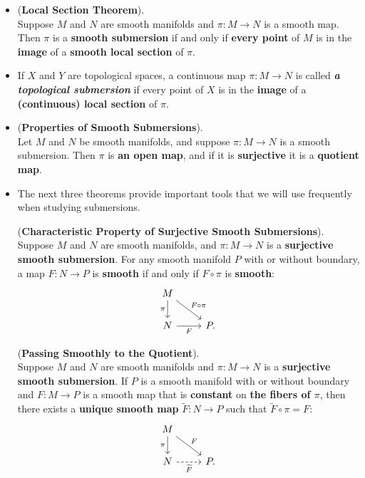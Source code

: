 \documentclass[11pt]{article}
\begin{document}
\begin{itemize}
\item \begin{theorem} (\textbf{Local Section Theorem}). \citep{lee2003introduction}\\
Suppose $M$ and $N$ are smooth manifolds and $\pi: M \rightarrow N$ is a smooth map. Then $\pi$ is a \textbf{smooth submersion} if and only if \textbf{every point} of $M$ is in the \textbf{image} of a \textbf{smooth local section} of $\pi$.
\end{theorem}

\item \begin{definition}
If $X$ and $Y$ are topological spaces, a continuous map $\pi: M \rightarrow N$ is called \emph{\textbf{a topological submersion}} if every point of $X$ is in the \textbf{image} of a \textbf{(continuous) local section} of $\pi$. 
\end{definition}

\item \begin{proposition} (\textbf{Properties of Smooth Submersions}). \\
Let $M$ and $N$ be smooth manifolds, and suppose $\pi: M \rightarrow N$ is a smooth submersion. Then $\pi$ is \textbf{an open map}, and if it is \textbf{surjective} it is a \textbf{quotient map}.
\end{proposition}

\item The next three theorems provide important tools that we will use frequently
when studying submersions. 
\begin{theorem} (\textbf{Characteristic Property of Surjective Smooth Submersions}).\\
Suppose $M$ and $N$ are smooth manifolds, and $\pi: M \rightarrow N$ is a \textbf{surjective smooth submersion}. For any smooth manifold $P$ with or without boundary, a map $F: N \rightarrow P$ is \textbf{smooth} if and only if $F \circ \pi$ is \textbf{smooth}:
\[
  \begin{tikzcd}
     M  \arrow[swap]{d}{\pi} \arrow[dr, "F \circ \pi"]  & \\
     N   \arrow[r, swap,  "F"]  & P.
  \end{tikzcd}
\] 
\end{theorem}


\begin{theorem} (\textbf{Passing Smoothly to the Quotient}).\\
Suppose $M$ and $N$ are smooth manifolds and  $\pi: M \rightarrow N$  is a \textbf{surjective smooth submersion}. If $P$ is a
smooth manifold with or without boundary and $F: M \rightarrow P$ is a smooth map that is \textbf{constant} on \textbf{the fibers of $\pi$}, then there exists a \textbf{unique smooth map} $\widetilde{F}: N \rightarrow P$ such that $\widetilde{F} \circ \pi = F$:
\[
  \begin{tikzcd}
     M  \arrow[swap]{d}{\pi} \arrow[dr, "F"]  & \\
     N   \arrow[r, swap, dashed,  "\widetilde{F}"]  & P.
  \end{tikzcd}
\] 
\end{theorem}


\end{itemize}
\end{document}
